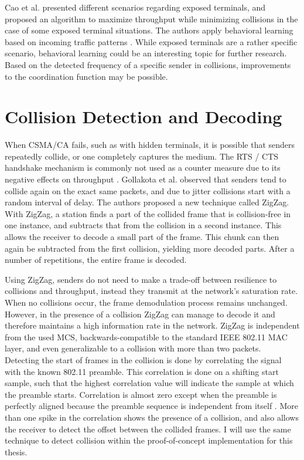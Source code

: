 Cao et al. presented different scenarios regarding exposed terminals, and proposed an algorithm to maximize throughput while minimizing collisions in the case of some exposed terminal situations. The authors apply behavioral learning based on incoming traffic patterns \cite{cao2009}. While exposed terminals are a rather specific scenario, behavioral learning could be an interesting topic for further research. Based on the detected frequency of a specific sender in collisions, improvements to the coordination function may be possible.



\section{Collision Detection and Decoding}

When \gls{CSMA/CA} fails, such as with hidden terminals, it is possible that senders repeatedly collide, or one completely captures the medium. The \gls{RTS} / \gls{CTS} handshake mechanism is commonly not used as a counter measure due to its negative effects on throughput \cite{bianchi2000, gollakota2008, choi2013}. Gollakota et al. observed that senders tend to collide again on the exact same packets, and due to jitter collisions start with a random interval of delay. The authors proposed a new technique called ZigZag. With ZigZag, a station finds a part of the collided frame that is collision-free in one instance, and subtracts that from the collision in a second instance. This allows the receiver to decode a small part of the frame. This chunk can then again be subtracted from the first collision, yielding more decoded parts. After a number of repetitions, the entire frame is decoded.

Using ZigZag, senders do not need to make a trade-off between resilience to collisions and throughput, instead they transmit at the network's saturation rate. When no collisions occur, the frame demodulation process remains unchanged. However, in the presence of a collision ZigZag can manage to decode it and therefore maintains a high information rate in the network. ZigZag is independent from the used \gls{MCS}, backwards-compatible to the standard IEEE 802.11 \gls{MAC} layer, and even generalizable to a collision with more than two packets.\\

Detecting the start of frames in the collision is done by correlating the signal with the known 802.11 preamble. This correlation is done on a shifting start sample, such that the highest correlation value will indicate the sample at which the preamble starts. Correlation is almost zero except when the preamble is perfectly aligned because the preamble sequence is independent from itself \cite{ieee2012}. More than one spike in the correlation shows the presence of a collision, and also allows the receiver to detect the offset between the collided frames. I will use the same technique to detect collision within the proof-of-concept implementation for this thesis.\\


